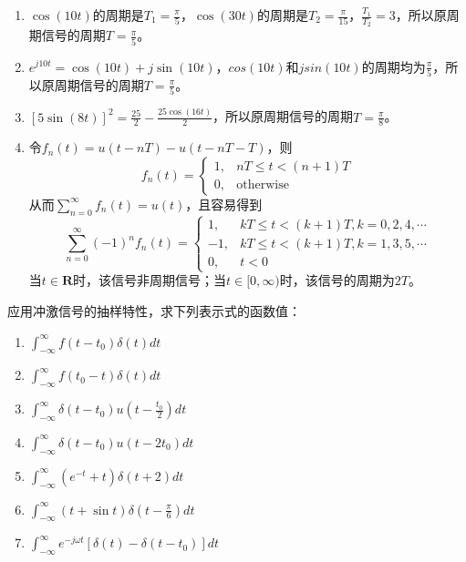 \documentclass[answers]{exam}  %
\begin{document}
\begin{questions}
\begin{solution}
	\begin{enumerate}[(1)]
		\item $\cos(10t)$的周期是$T_1=\frac{\pi}{5}$，$\cos(30t)$的周期是$T_2=\frac{\pi}{15}$，$\frac{T_1}{T_2}=3$，所以原周期信号的周期$T=\frac{\pi}{5}$。
		\item $e^{j10t}=\cos(10t)+j\sin(10t)$，$cos(10t)$和$jsin(10t)$的周期均为$\frac{\pi}{5}$，所以原周期信号的周期$T=\frac{\pi}{5}$。
		\item $\left[5 \sin(8t) \right]^2=\frac{25}{2}-\frac{25\cos(16t)}{2}$，所以原周期信号的周期$T=\frac{\pi}{8}$。
		\item 令$f_n(t)=u(t-nT)-u(t-nT-T)$，则
		        \begin{equation} \nonumber
		        	f_n(t) = 
		        	\begin{cases}
		        		1, & nT\leq t<(n+1)T \\
		        		0, & \text{otherwise}
		        	\end{cases}
		        \end{equation}
	          从而$\sum_{n=0}^{\infty}f_n(t)=u(t)$，且容易得到
	          \begin{equation} \nonumber
	          	\sum_{n=0}^{\infty}(-1)^nf_n(t) = 
	          	\begin{cases}
	          		1, & kT\leq t<(k+1)T,k=0,2,4,\cdots \\
	          		-1, & kT\leq t<(k+1)T, k=1,3,5,\cdots\\
	          		0, & t<0
	          	\end{cases}
	          \end{equation}
              当$t\in\mathbf{R}$时，该信号非周期信号；当$t\in[0,\infty)$时，该信号的周期为$2T$。
	          
	\end{enumerate}
\end{solution}


\question 应用冲激信号的抽样特性，求下列表示式的函数值：
\begin{enumerate}[(1)]
	\item $\int_{-\infty}^{\infty} f(t-t_0)\delta(t) dt$
	\item $\int_{-\infty}^{\infty} f(t_0-t)\delta(t) dt$
	\item $\int_{-\infty}^{\infty} \delta(t-t_0)u(t-\frac{t_0}{2}) dt$
	\item $\int_{-\infty}^{\infty} \delta(t-t_0)u(t-2t_0) dt$
	\item $\int_{-\infty}^{\infty} (e^{-t}+t)\delta(t+2) dt$
	\item $\int_{-\infty}^{\infty} (t+\sin t)\delta(t-\frac{\pi}{6}) dt$
	\item $\int_{-\infty}^{\infty} e^{-j\omega t}\left[ \delta(t)-\delta(t-t_0)\right] dt$
\end{enumerate}


\end{questions}
\end{document}
